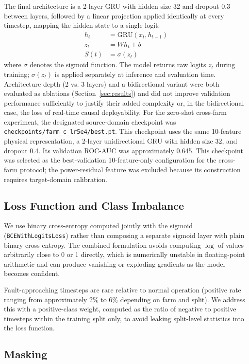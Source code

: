 \documentclass[conference]{IEEEtran}
\begin{document}
The final architecture is a 2-layer GRU with hidden size 32 and dropout
0.3 between layers, followed by a linear projection applied identically at
every timestep, mapping the hidden state to a single logit:
\begin{align}
h_t &= \mathrm{GRU}(x_t, h_{t-1}) \\
z_t &= W h_t + b \\
S(t) &= \sigma(z_t)
\end{align}
where $\sigma$ denotes the sigmoid function. The model returns raw logits
$z_t$ during training; $\sigma(z_t)$ is applied separately at inference and
evaluation time. Architecture depth (2 vs. 3 layers) and a bidirectional
variant were both evaluated as ablations (Section~\ref{sec:results}) and
did not improve validation performance sufficiently to justify their added
complexity or, in the bidirectional case, the loss of real-time causal
deployability.
For the zero-shot cross-farm experiment, the designated source-domain
checkpoint was \texttt{checkpoints/farm\_c\_lr5e4/best.pt}. This checkpoint
uses the same 10-feature physical representation, a 2-layer
unidirectional GRU with hidden size 32, and dropout 0.4. Its validation
ROC-AUC was approximately 0.645. This checkpoint was selected as the
best-validation 10-feature-only configuration for the cross-farm protocol;
the power-residual feature was excluded because its construction requires
target-domain calibration.
\subsection{Loss Function and Class Imbalance}

We use binary cross-entropy computed jointly with the sigmoid
(\texttt{BCEWithLogitsLoss}) rather than composing a separate sigmoid
layer with plain binary cross-entropy. The combined formulation avoids
computing $\log$ of values arbitrarily close to 0 or 1 directly, which is
numerically unstable in floating-point arithmetic and can produce vanishing
or exploding gradients as the model becomes confident.

Fault-approaching timesteps are rare relative to normal operation
(positive rate ranging from approximately 2\% to 6\% depending on farm and
split). We address this with a positive-class weight, computed as the
ratio of negative to positive timesteps within the training split only,
to avoid leaking split-level statistics into the loss function.

\subsection{Masking}
\end{document}
